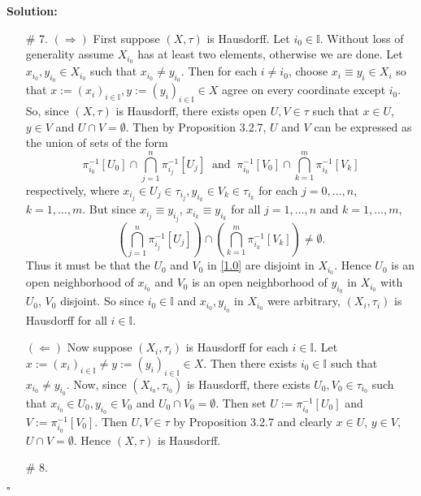 \documentclass[12pt]{article}
\newcounter{ProofCounter}
\newenvironment{Solution}{\stepcounter{ProofCounter}\textbf{Solution:}}{\hfill$\square$}
\begin{document}
\begin{Solution}
\begin{enumerate}
    \item[\# 7.] $(\Rightarrow)$ First suppose $(X, \tau)$ is Hausdorff. Let $i_0 \in \mathbb{I}$. Without loss of generality assume $X_{i_0}$ has at
      least two elements, otherwise we are done.
      Let $x_{i_0}, y_{i_0} \in X_{i_0}$ such that $x_{i_0} \neq y_{i_0}$. Then for each $i \neq i_{0}$, choose $x_i \equiv y_i \in X_i$ so that 
      $x := \left( x_i \right)_{i\in\mathbb{I}}, y := \left( y_i \right)_{i\in\mathbb{I}} \in X$ agree on every coordinate except $i_0$.
      So, since $(X, \tau)$ is Hausdorff, there exists open $U,V \in \tau$ such that $x \in U$, $y \in V$ and $U \cap V = \emptyset$. Then by Proposition
      3.2.7, $U$ and $V$ can be expressed as the union of sets of the form
      \begin{equation}
        \pi_{i_0}^{-1}[U_{0}] \cap \bigcap_{j=1}^{n} \pi_{i_j}^{-1}[U_j]   \ \text{ and }\ 
        \pi_{i_0}^{-1}[V_{0}] \cap \bigcap_{k=1}^{m} \pi_{i_k}^{-1}[V_k]
        \label{1.0}
      \end{equation}
      respectively, where $x_{i_j} \in U_j \in \tau_{i_j}, y_{i_k} \in V_{k} \in \tau_{i_k}$ for each $j = 0,\dots, n$, $k = 1,\dots,m$.
      But since $x_{i_j} \equiv y_{i_j}$, $x_{i_k} \equiv y_{i_k}$ for all $j = 1, \dots, n$ and $k = 1,\dots, m$, 
      \[
        \left( \bigcap_{j=1}^{n}\pi_{i_j}^{-1}[U_j] \right) \cap \left( \bigcap_{k=1}^{m}\pi_{i_k}^{-1}[V_k] \right) \neq \emptyset.
      \]
      Thus it must be that the $U_0$ and $V_0$ in \eqref{1.0} are disjoint in $X_{i_0}$.
      Hence $U_0$ is an open neighborhood of $x_{i_0}$ and $V_0$ is an open neighborhood of $y_{i_0}$ in $X_{i_0}$ with $U_0$, $V_0$ disjoint.
      So since $i_0 \in \mathbb{I}$ and $x_{i_0}, y_{i_0}$ in $X_{i_0}$ were arbitrary, $(X_i, \tau_i)$ is Hausdorff for all $i \in \mathbb{I}$.

      $(\Leftarrow)$ Now suppose $(X_i, \tau_i)$ is Hausdorff for each $i \in \mathbb{I}$. Let $x := (x_i)_{i\in\mathbb{I}} \neq y := \left( y_i
      \right)_{i\in\mathbb{I}} \in X$. Then there exists $i_0 \in \mathbb{I}$ such that $x_{i_0} \neq y_{i_0}$. Now, since $(X_{i_0}, \tau_{i_0})$ is
      Hausdorff, there exists $U_{0}, V_{0} \in \tau_{i_0}$ such that $x_{i_0} \in U_{0}, y_{i_0} \in V_0$ and $U_0 \cap V_0 = \emptyset$.
      Then set $U := \pi_{i_0}^{-1}[U_0]$ and $V := \pi_{i_0}^{-1}[V_0]$. Then $U,V \in \tau$ by Proposition 3.2.7 and clearly $x \in U$, $y \in V$,
      $U\cap V = \emptyset$. Hence $(X,\tau)$ is Hausdorff.

    \item[\# 8.]
  \end{enumerate}
\end{Solution}
\end{document}
